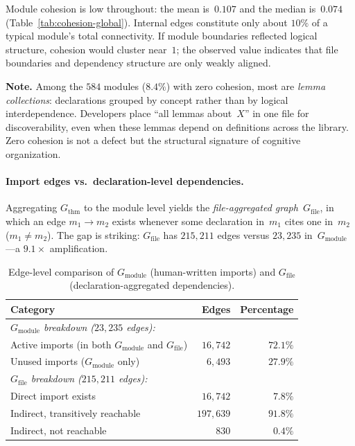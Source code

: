 Module cohesion is low throughout: the mean is~$0.107$ and the median is~$0.074$ (Table~\ref{tab:cohesion-global}). Internal edges constitute only about $10\%$ of a typical module's total connectivity. If module boundaries reflected logical structure, cohesion would cluster near~$1$; the observed value indicates that file boundaries and dependency structure are only weakly aligned.

\noindent\textbf{Note.}
\label{rem:zero-cohesion}
Among the $584$ modules ($8.4\%$) with zero cohesion, most are \emph{lemma collections}: declarations grouped by concept rather than by logical interdependence. Developers place ``all lemmas about~$X$'' in one file for discoverability, even when these lemmas depend on definitions across the library. Zero cohesion is not a defect but the structural signature of cognitive organization.

\paragraph{Import edges vs.\ declaration-level dependencies.}
\label{sec:import_vs_declaration}

\noindent Aggregating $G_{\mathrm{thm}}$ to the module level yields the \emph{file-aggregated graph}~$G_{\mathrm{file}}$, in which an edge $m_1 \to m_2$ exists whenever some declaration in~$m_1$ cites one in~$m_2$ ($m_1 \neq m_2$). The gap is striking: $G_{\mathrm{file}}$ has $215{,}211$ edges versus $23{,}235$ in~$G_{\mathrm{module}}$---a $9.1\times$ amplification.

\begin{table}[ht]
\centering
\caption{Edge-level comparison of $G_{\mathrm{module}}$ (human-written imports) and $G_{\mathrm{file}}$ (declaration-aggregated dependencies).}
\label{tab:import-vs-file}
\begin{tabular}{lrr}
\toprule
Category & Edges & Percentage \\
\midrule
\multicolumn{3}{l}{\emph{$G_{\mathrm{module}}$ breakdown ($23{,}235$ edges):}} \\
\quad Active imports (in both $G_{\mathrm{module}}$ and $G_{\mathrm{file}}$) & $16{,}742$ & $72.1\%$ \\
\quad Unused imports ($G_{\mathrm{module}}$ only) & $6{,}493$ & $27.9\%$ \\
\midrule
\multicolumn{3}{l}{\emph{$G_{\mathrm{file}}$ breakdown ($215{,}211$ edges):}} \\
\quad Direct import exists & $16{,}742$ & $7.8\%$ \\
\quad Indirect, transitively reachable & $197{,}639$ & $91.8\%$ \\
\quad Indirect, not reachable & $830$ & $0.4\%$ \\
\bottomrule
\end{tabular}
\end{table}

